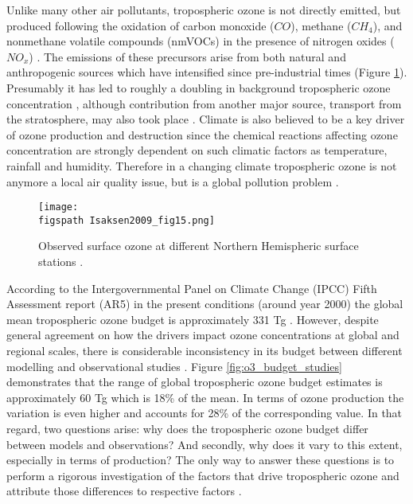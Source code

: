 \documentclass[11pt,a4paper]{article}
\newcommand{\figspath}{figures/}
\begin{document}
Unlike many other air pollutants, tropospheric ozone is not directly emitted, but produced following the oxidation of carbon monoxide ($CO$), methane ($CH_4$), and nonmethane volatile compounds (nmVOCs) in the presence of nitrogen oxides ($NO_x$) \citep{Crutzen1973,Myhre2013}. The emissions of these precursors arise from both natural and anthropogenic sources which have intensified since pre-industrial times \citep{Parrish2014,Volz1988} (Figure \ref{fig:Isaksen2009_fig15}). Presumably it has led to roughly a doubling in background tropospheric ozone concentration \citep{Guicherit2000,Hartmann2013,Tarasick2008,Vingarzan2004}, although contribution from another major source, transport from the stratosphere, may also took place \citep{Fowler2008}. Climate is also believed to be a key driver of ozone production and destruction since the chemical reactions affecting ozone concentration are strongly dependent on such climatic factors as temperature, rainfall and humidity. Therefore in a changing climate tropospheric ozone is not anymore a local air quality issue, but is a global pollution problem \citep{Fowler2008}.

\begin{figure}[h]
\centering
\texttt{[image: \\figspath Isaksen2009\_fig15.png]}
\caption{Observed surface ozone at different Northern Hemispheric surface stations \citep{Isaksen2009}.}
\label{fig:Isaksen2009_fig15}
\end{figure}

According to the Intergovernmental Panel on Climate Change (IPCC) Fifth Assessment report (AR5) in the present conditions (around year 2000) the global mean tropospheric ozone budget is approximately 331 Tg \citep{Myhre2013}. However, despite general agreement on how the drivers impact ozone concentrations at global and regional scales, there is considerable inconsistency in its budget between different modelling and observational studies \citep{Stevenson2006,Wild2007,Young2012}. Figure \ref{fig:o3_budget_studies} demonstrates that the range of global tropospheric ozone budget estimates is approximately 60 Tg which is 18\% of the mean. In terms of ozone production the variation is even higher and accounts for 28\% of the corresponding value. In that regard, two questions arise: why does the tropospheric ozone budget differ between models and observations? And secondly, why does it vary to this extent, especially in terms of production? The only way to answer these questions is to perform a rigorous investigation of the factors that drive tropospheric ozone and attribute those differences to respective factors \citep{Young2012}.
\end{document}
